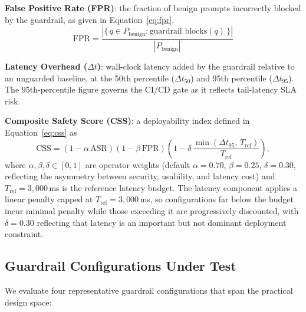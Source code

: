 \documentclass{mdpi}
\begin{document}
\noindent\textbf{False Positive Rate (FPR)}: the fraction of benign
prompts incorrectly blocked by the guardrail, as given in Equation~\eqref{eq:fpr}.
\begin{equation}
  \label{eq:fpr}
  \text{FPR} = \frac{|\{\,q \in P_\text{benign} : \text{guardrail blocks}(q)\,\}|}{|P_\text{benign}|}
\end{equation}

\noindent\textbf{Latency Overhead ($\Delta t$)}: wall-clock latency added
by the guardrail relative to an unguarded baseline, at the 50th percentile
($\Delta t_{50}$) and 95th percentile ($\Delta t_{95}$). The 95th-percentile
figure governs the CI/CD gate as it reflects tail-latency SLA risk.

\noindent\textbf{Composite Safety Score (CSS)}: a deployability index
defined in Equation~\eqref{eq:css} as
\begin{equation}
  \label{eq:css}
  \text{CSS} = (1 - \alpha\,\text{ASR})(1 - \beta\,\text{FPR})
               \!\left(1 - \delta\,\frac{\min(\Delta t_{95},\,T_{\mathrm{ref}})}{T_{\mathrm{ref}}}\right),
\end{equation}
where $\alpha, \beta, \delta \in [0,1]$ are operator weights (default $\alpha{=}0.70$,
$\beta{=}0.25$, $\delta{=}0.30$, reflecting the asymmetry between security, usability,
and latency cost) and $T_{\mathrm{ref}}=3{,}000$\,ms is the reference latency budget.
The latency component applies a linear penalty capped at $T_{\mathrm{ref}}=3{,}000$\,ms,
so configurations far below the budget incur minimal penalty while those exceeding it
are progressively discounted, with $\delta=0.30$ reflecting that latency is an important
but not dominant deployment constraint.

\subsection{Guardrail Configurations Under Test}

We evaluate four representative guardrail configurations that span the
practical design space:
\end{document}
